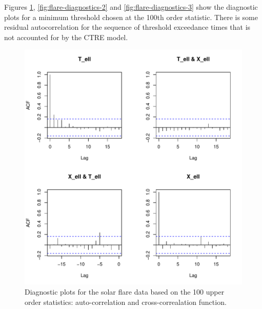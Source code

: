 \documentclass[]{elsarticle} %
\begin{document}
Figures \ref{fig:flare-diagnostics-1}, \ref{fig:flare-diagnostics-2} and
\ref{fig:flare-diagnostics-3} show the diagnostic plots for a minimum
threshold chosen at the 100th order statistic. There is some residual
autocorrelation for the sequence of threshold exceedance times that is
not accounted for by the CTRE model.

\begin{figure}
\includegraphics[width=\textwidth]{article_springer_files/figure-latex/flare-diagnostics-1-1} \caption{\label{fig:flare-diagnostics-1} Diagnostic plots for the solar flare data based on the 100 upper order statistics: auto-correlation and cross-correalation function.}\label{fig:flare-diagnostics-1}
\end{figure}
\end{document}
